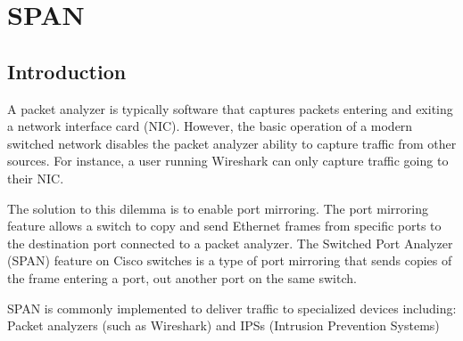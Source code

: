 \section{SPAN}
\subsection{Introduction}
A packet analyzer is typically software that captures packets entering and exiting a network interface card (NIC). However, the basic operation of a modern switched network disables the packet analyzer ability to capture traffic from other sources. For instance, a user running Wireshark can only capture traffic going to their NIC.\par 
The solution to this dilemma is to enable port mirroring. The port mirroring feature allows a switch to copy and send Ethernet frames from specific ports to the destination port connected to a packet analyzer. The Switched Port Analyzer (SPAN) feature on Cisco switches is a type of port mirroring that sends copies of the frame entering a port, out another port on the same switch.\par 
SPAN is commonly implemented to deliver traffic to specialized devices including: Packet analyzers (such as Wireshark) and IPSs (Intrusion Prevention Systems)
